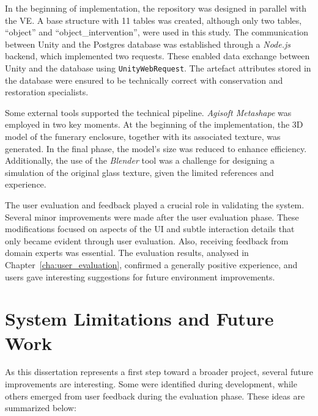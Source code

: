 In the beginning of implementation, the repository was designed in parallel with the \gls{VE}. A base structure with 11 tables was created, although only two tables, “object” and “object\_intervention”, were used in this study. The communication between Unity and the Postgres database was established through a \emph{Node.js} backend, which implemented two requests. These enabled data exchange between Unity and the database using \texttt{UnityWebRequest}. The artefact attributes stored in the database were ensured to be technically correct with conservation and restoration specialists.

Some external tools supported the technical pipeline. \emph{Agisoft Metashape} was employed in two key moments. 
At the beginning of the implementation,  the \gls{3D} model of the funerary enclosure, together with its associated texture, was generated. In the final phase, the model's size was reduced to enhance efficiency.
Additionally, the use of the \emph{Blender} tool was a challenge for designing a simulation of the original glass texture, given the limited references and experience.

The user evaluation and feedback played a crucial role in validating the system. Several minor improvements were made after the user evaluation phase. These modifications focused on aspects of the \gls{UI} and subtle interaction details that only became evident through user evaluation. Also, receiving feedback from domain experts was essential. The evaluation results, analysed in Chapter~\ref{cha:user_evaluation}, confirmed a generally positive experience, and users gave interesting suggestions for future environment improvements.



\section{System Limitations and Future Work}
\label{sec:future}
As this dissertation represents a first step toward a broader project, several future improvements are interesting. 
Some were identified during development, while others emerged from user feedback during the evaluation phase. 
These ideas are summarized below:

